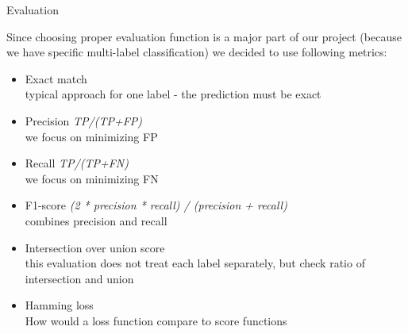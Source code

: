 \documentclass{beamer}
\begin{document}
\begin{frame}[t]{Evaluation}

\vspace{-3mm}

Since choosing proper evaluation function is a major part of our project (because we have specific multi-label classification) we decided to use following metrics:
	
\begin{itemize}
	
\pause
\item Exact match \\
typical approach for one label - the prediction must be exact

\pause
\item Precision {\it TP/(TP+FP)} \\
we focus on minimizing FP

\pause
\item Recall {\it TP/(TP+FN)} \\
we focus on minimizing FN

\pause
\item F1-score {\it (2 * precision * recall) / (precision + recall)} \\
combines precision and recall

\pause
\item Intersection over union score \\
this evaluation does not treat each label separately, but check ratio of intersection and union

\pause
\item Hamming loss \\
How would a loss function compare to score functions
\end{itemize}
\end{frame}
\end{document}
